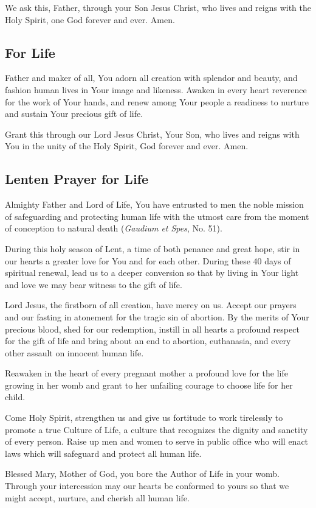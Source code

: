 \documentclass[12pt]{article}
\newcommand{\prayertitle}[1]{\subsection{#1}}
\begin{document}
We ask this, Father, through your Son Jesus Christ, who lives and reigns with the Holy Spirit, one God forever and ever.
Amen.

\prayertitle{For Life}
Father and maker of all, You adorn all creation with splendor and beauty, and fashion human lives in Your image and likeness.
Awaken in every heart reverence for the work of Your hands, and renew among Your people
a readiness to nurture and sustain Your precious gift of life.

Grant this through our Lord Jesus Christ, Your Son, who lives and reigns with You in 
the unity of the Holy Spirit, God forever and ever.
Amen.

\prayertitle{Lenten Prayer for Life}
Almighty Father and Lord of Life,
You have entrusted to men the noble mission of safeguarding and protecting human life with the utmost care from the moment of conception to natural death (\textit{Gaudium et Spes}, No. 51).

During this holy season of Lent, a time of both penance and great hope, stir in our hearts a greater love for You and for each other.
During these 40 days of spiritual renewal, lead us to a deeper conversion so that by living in Your light and love we may bear witness to the gift of life.

Lord Jesus, the firstborn of all creation, have mercy on us. 
Accept our prayers and our fasting in atonement for the tragic sin of abortion. 
By the merits of Your precious blood, shed for our redemption, instill in all hearts a profound respect for the gift of life and bring about an end to abortion, euthanasia, and every other assault on innocent human life.

Reawaken in the heart of every pregnant mother a profound love for the life growing in her womb and grant to her unfailing courage to choose life for her child.

Come Holy Spirit, strengthen us and give us fortitude to work tirelessly to promote a true Culture of Life, a culture that recognizes the dignity and sanctity of every person.
Raise up men and women to serve in public office who will enact laws which will safeguard and protect all human life.

Blessed Mary, Mother of God, you bore the Author of Life in your womb. 
Through your intercession may our hearts be conformed to yours so that we might accept, nurture, and cherish all human life.
\end{document}
